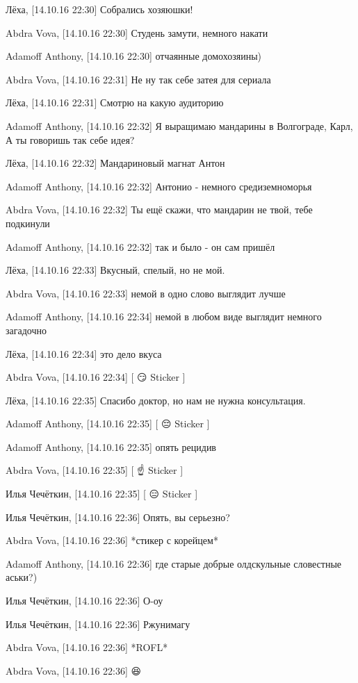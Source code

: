 Лёха, [14.10.16 22:30]
Собрались хозяюшки!

Abdra Vova, [14.10.16 22:30]
Студень замути, немного накати

Adamoff Anthony, [14.10.16 22:30]
отчаянные домохозяины)

Abdra Vova, [14.10.16 22:31]
Не ну так себе затея для сериала

Лёха, [14.10.16 22:31]
Смотрю на какую аудиторию

Adamoff Anthony, [14.10.16 22:32]
Я выращимаю мандарины в Волгограде, Карл, А ты говоришь так себе идея?

Лёха, [14.10.16 22:32]
Мандариновый магнат Антон

Adamoff Anthony, [14.10.16 22:32]
Антонио - немного средиземноморья

Abdra Vova, [14.10.16 22:32]
Ты ещё скажи, что мандарин не твой, тебе подкинули

Adamoff Anthony, [14.10.16 22:32]
так и было - он сам пришёл

Лёха, [14.10.16 22:33]
Вкусный, спелый, но не мой.

Abdra Vova, [14.10.16 22:33]
немой в одно слово выглядит лучше

Adamoff Anthony, [14.10.16 22:34]
немой в любом виде выглядит немного загадочно

Лёха, [14.10.16 22:34]
это дело вкуса

Abdra Vova, [14.10.16 22:34]
[ 😏 Sticker ]

Лёха, [14.10.16 22:35]
Спасибо доктор, но нам не нужна консультация.

Adamoff Anthony, [14.10.16 22:35]
[ 😔 Sticker ]

Adamoff Anthony, [14.10.16 22:35]
опять рецидив

Abdra Vova, [14.10.16 22:35]
[ ☝️ Sticker ]

Илья Чечёткин, [14.10.16 22:35]
[ 😑 Sticker ]

Илья Чечёткин, [14.10.16 22:36]
Опять, вы серьезно?

Abdra Vova, [14.10.16 22:36]
*стикер с корейцем*

Adamoff Anthony, [14.10.16 22:36]
где старые добрые олдскульные словестные аськи?)

Илья Чечёткин, [14.10.16 22:36]
О-оу

Илья Чечёткин, [14.10.16 22:36]
Ржунимагу

Abdra Vova, [14.10.16 22:36]
*ROFL*

Abdra Vova, [14.10.16 22:36]
😆

